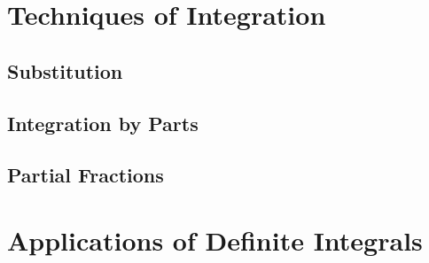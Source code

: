 \chapter{Techniques of Integration}
\section{Substitution}


\section{Integration by Parts}



\section{Partial Fractions}

\chapter{Applications of Definite Integrals}

\chapter{}
